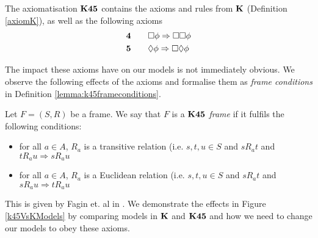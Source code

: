\begin{defn} \label{axiomK45}
The axiomatisation $\bf K45$ contains the axioms and rules from $\bf K$ (Definition
    \ref{axiomK}), as well as the following axioms
\begin{alignat*}{2}
  & \bf 4 && \quad \Box \phi \Rightarrow \Box \Box \phi \\
  & \bf 5 && \quad \Diamond \phi \Rightarrow \Box \Diamond \phi
\end{alignat*}
\end{defn}

The impact these axioms have on our models is not immediately obvious.
We observe the following effects of the axioms and formalise them as {\em frame conditions} in
Definition \ref{lemma:k45frameconditions}.

\begin{defn} \label{lemma:k45frameconditions}
	Let $F = (S,R)$ be a frame.
	We say that $F$ is a {\em $\bf K45$ frame} if it fulfils the following conditions:
	\begin{itemize}
		\item for all $a \in A$, $R_a$ is a transitive relation (i.e. $s, t, u \in S$ and $s R_a t$ and $t R_a u \Rightarrow
			s R_a u$
		\item for all $a \in A$, $R_a$ is a Euclidean relation (i.e. $s, t, u \in S$ and $s R_a t$ and
			$s R_a u \Rightarrow t R_a u$
	\end{itemize}
\end{defn}

This is given by Fagin et. al in \cite{fagin1995reasoning}.
We demonstrate the effects in Figure \ref{k45VsKModels} by comparing models in $\bf K$ and $\bf K45$ and how we need to change
our models to obey these axioms.


